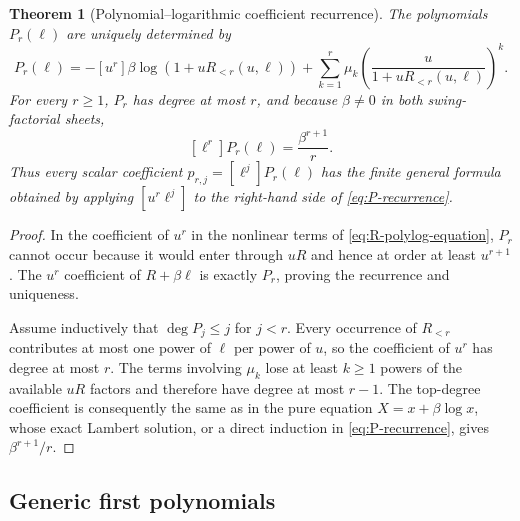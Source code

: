 \documentclass[11pt,a4paper]{article}
\theoremstyle{clean}
\newtheorem{theorem}{Theorem}[section]
\theoremstyle{definition}
\newcommand{\be}{\beta}
\newcommand{\Coeff}[2]{\left[#1\right]#2}
\begin{document}
\begin{theorem}[Polynomial--logarithmic coefficient recurrence]
\label{thm:P-recurrence}
The polynomials \(P_r(\ell)\) are uniquely determined by
\begin{equation}
 \boxed{\displaystyle
 P_r(\ell)=-\Coeff{u^r}{
 \be\log\!\left(1+uR_{<r}(u,\ell)\right)
 +\sum_{k=1}^r\mu_k
 \left(\frac{u}{1+uR_{<r}(u,\ell)}\right)^k}.}
 \label{eq:P-recurrence}
\end{equation}
For every \(r\ge1\), \(P_r\) has degree at most \(r\), and because \(\be\ne0\) in both swing-factorial sheets,
\begin{equation}
 \Coeff{\ell^r}{P_r(\ell)}=\frac{\be^{r+1}}{r}.
 \label{eq:P-leading}
\end{equation}
Thus every scalar coefficient \(p_{r,j}=\Coeff{\ell^j}{P_r(\ell)}\) has the finite general formula obtained by applying \(\Coeff{u^r\ell^j}{}\) to the right-hand side of \cref{eq:P-recurrence}.
\end{theorem}

\begin{proof}
In the coefficient of \(u^r\) in the nonlinear terms of \cref{eq:R-polylog-equation}, \(P_r\) cannot occur because it would enter through \(uR\) and hence at order at least \(u^{r+1}\).  The \(u^r\) coefficient of \(R+\be\ell\) is exactly \(P_r\), proving the recurrence and uniqueness.

Assume inductively that \(\deg P_j\le j\) for \(j<r\).  Every occurrence of \(R_{<r}\) contributes at most one power of \(\ell\) per power of \(u\), so the coefficient of \(u^r\) has degree at most \(r\).  The terms involving \(\mu_k\) lose at least \(k\ge1\) powers of the available \(uR\) factors and therefore have degree at most \(r-1\).  The top-degree coefficient is consequently the same as in the pure equation \(X=x+\be\log x\), whose exact Lambert solution, or a direct induction in \cref{eq:P-recurrence}, gives \(\be^{r+1}/r\).
\end{proof}

\subsection{Generic first polynomials}
\end{document}
